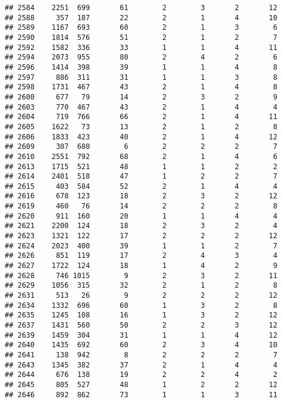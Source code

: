 \documentclass[]{article}
\begin{document}
\begin{verbatim}
## 2584    2251  699       61        2        3       2       12
## 2588     357  187       22        2        1       4       10
## 2589    1167  693       60        2        1       3        6
## 2590    1814  576       51        2        1       2        7
## 2592    1582  336       33        1        1       4       11
## 2594    2073  955       80        2        4       2        6
## 2596    1414  398       39        1        1       4        8
## 2597     886  311       31        1        1       3        8
## 2598    1731  467       43        2        1       4        8
## 2600     677   79       14        2        3       2        9
## 2603     770  467       43        2        1       4        4
## 2604     719  766       66        2        1       4       11
## 2605    1622   73       13        2        1       2        8
## 2606    1833  423       40        2        1       4       12
## 2609     307  680        6        2        2       2        7
## 2610    2551  792       68        2        1       4        6
## 2613    1715  521       48        1        1       2        2
## 2614    2401  518       47        1        2       2        7
## 2615     403  584       52        2        1       4        4
## 2616     678  123       18        2        3       2       12
## 2619     460   76       14        2        2       2        8
## 2620     911  160       20        1        1       4        4
## 2621    2200  124       18        2        3       2        4
## 2623    1321  122       17        2        2       2       12
## 2624    2023  400       39        1        1       2        7
## 2626     851  119       17        2        4       3        4
## 2627    1722  124       18        1        4       2        9
## 2628     746 1015        9        2        3       2       11
## 2629    1056  315       32        2        1       2        8
## 2631     513   26        9        2        2       2       12
## 2634    1332  696       60        1        3       2        8
## 2635    1245  108       16        1        3       2       12
## 2637    1431  560       50        2        2       3       12
## 2639    1459  304       31        1        1       4       12
## 2640    1435  692       60        2        3       4       10
## 2641     138  942        8        2        2       2        7
## 2643    1345  382       37        2        1       4        4
## 2644     676  138       19        2        2       4        2
## 2645     805  527       48        1        2       2       12
## 2646     892  862       73        1        1       3       11

\end{verbatim}
\end{document}
